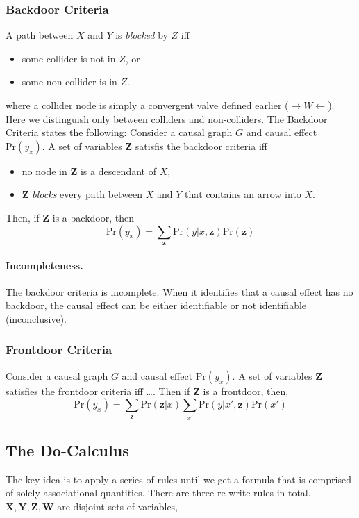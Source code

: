 \documentclass[11pt]{article}
\newcommand{\bz}{\mathbf{z}}
\newcommand{\pr}{\mathrm{Pr}}
\begin{document}
\subsubsection{Backdoor Criteria}
A path between $X$ and $Y$ is \textit{\color{Thistle} blocked} by $Z$ iff 
\begin{itemize}
	\item some collider is not in $Z$, or
	\item some non-collider is in $Z$. 
\end{itemize}
where a collider node is simply a convergent valve defined earlier ($\rightarrow W \leftarrow$). Here we distinguish only between colliders and non-colliders. The Backdoor Criteria states the following: Consider a causal graph $G$ and causal effect $\pr(y_x)$. A set of variables $\mathbf Z$ satisfis the backdoor criteria iff 
\begin{itemize}
	\item no node in $\mathbf Z$ is a descendant of $X$, 
	\item $\mathbf Z$ \textit{\color{Thistle} blocks} every path between $X$ and $Y$ that contains an arrow into $X$. 
\end{itemize}
Then, if $\mathbf Z$ is a backdoor, then
\begin{equation}
	\pr ( y _ x) = \sum_{\bz} \pr (y | x, \bz) \pr (\bz)
\end{equation}

\paragraph{Incompleteness.} The backdoor criteria is incomplete. When it identifies that a causal effect has no backdoor, the causal effect can be either identifiable or not identifiable (inconclusive).  


\subsubsection{Frontdoor Criteria}
Consider a causal graph $G$ and causal effect $\pr(y_x)$. A set of variables $\mathbf Z$ satisfies the frontdoor criteria iff \dots. Then if $\mathbf Z$ is a frontdoor, then, 
\begin{equation}
	\pr ( y _ x ) = \sum _ \bz \pr (\bz | x ) \sum_{x'} \pr(y | x', \bz ) \pr(x')
\end{equation}

\subsection{The Do-Calculus}
The key idea is to apply a series of rules until we get a formula that is comprised of solely associational quantities. There are three re-write rules in total. $\mathbf X, \mathbf Y, \mathbf Z, \mathbf W$ are disjoint sets of variables, 
\end{document}
